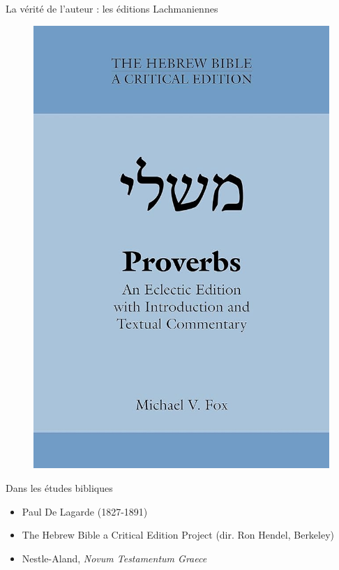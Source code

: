 \documentclass[11pt]{beamer}
\begin{document}
\begin{frame}{La vérité de l'auteur : les éditions Lachmaniennes}
    \begin{minipage}{.4\textwidth}
        \begin{figure}
            \centering
            \includegraphics[width=1\linewidth]{img/fox_cover.jpg}
        \end{figure} 
    \end{minipage}%
    \hfill
    \begin{minipage}{.5\textwidth}
        \begin{block}{Dans les études bibliques}
            \begin{itemize}
                \item Paul De Lagarde (1827-1891)\\
                        \footnotesize{}
                \item The Hebrew Bible a Critical Edition Project (dir. Ron Hendel, Berkeley)
                \item Nestle-Aland, \textit{Novum Testamentum Graece}
            \end{itemize}   
        \end{block}
    \end{minipage}
\end{frame}
\end{document}
